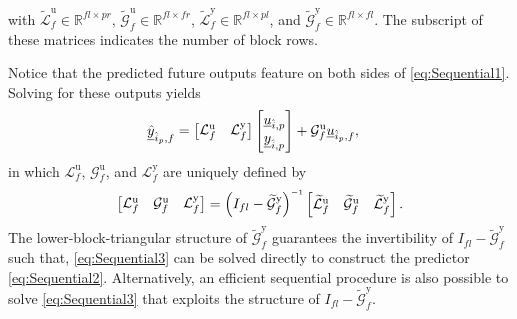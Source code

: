 with ${\widetilde{\mathcal{L}}^\mathrm{u}_f\in\mathbb{R}^{fl\times pr}}$, ${\widetilde{\mathcal{G}}^\mathrm{u}_f\in\mathbb{R}^{fl\times fr}}$, ${\widetilde{\mathcal{L}}^\mathrm{y}_f\in\mathbb{R}^{fl\times pl}}$, and ${\widetilde{\mathcal{G}}^\mathrm{y}_f\in\mathbb{R}^{fl\times fl}}$. The subscript of these matrices indicates the number of block rows.

Notice that the predicted future outputs feature on both sides of \eqref{eq:Sequential1}. Solving for these outputs yields
\begin{align}\label{eq:Sequential2}
    \underline{\hat{y}}_{\hat{i}_p,f} &=
    \begin{bmatrix}
        \mathcal{L}^\mathrm{u}_f & \mathcal{L}^\mathrm{y}_f 
    \end{bmatrix}    
    \begin{bmatrix}
        \underline{u}_{\hat{i},p}\\
        \underline{y}_{\hat{i},p}
    \end{bmatrix}+
    \mathcal{G}^\mathrm{u}_f
    \underline{u}_{\hat{i}_p,f},
\end{align}%
in which $\mathcal{L}^\mathrm{u}_f$, $\mathcal{G}^\mathrm{u}_f$, and $\mathcal{L}^\mathrm{y}_f$ are uniquely defined by
\begin{align}\label{eq:Sequential3}
    \begin{bmatrix}
        \mathcal{L}^\mathrm{u}_f & \mathcal{G}^\mathrm{u}_f & \mathcal{L}^\mathrm{y}_f
    \end{bmatrix}=
    \left(I_{fl}-\widetilde{\mathcal{G}}^\mathrm{y}_f\right)\inv
    \begin{bmatrix}
        \widetilde{\mathcal{L}}^\mathrm{u}_f & \widetilde{\mathcal{G}}^\mathrm{u}_f & \widetilde{\mathcal{L}}^\mathrm{y}_f
    \end{bmatrix}.
\end{align}
The lower-block-triangular structure of $\widetilde{\mathcal{G}}^\mathrm{y}_f$ guarantees the invertibility of ${I_{fl}-\widetilde{\mathcal{G}}^\mathrm{y}_f}$ such that, \eqref{eq:Sequential3} can be solved directly %
to construct the predictor \eqref{eq:Sequential2}. Alternatively, an efficient sequential procedure is also possible to solve \eqref{eq:Sequential3} that exploits the structure of $I_{fl}-\widetilde{\mathcal{G}}^\mathrm{y}_f$.

